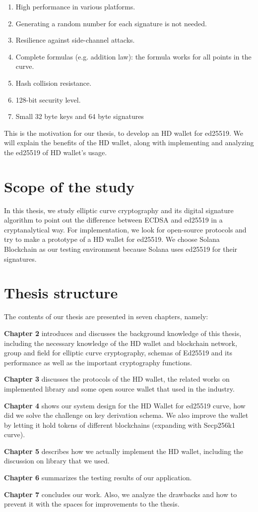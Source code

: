 \begin{enumerate}
    \item High performance in various platforms.   
    \item Generating a random number for each signature is not needed.
    \item Resilience against side-channel attacks.
    \item Complete formulas (e.g. addition law): the formula works for all points in the curve.
    \item Hash collision resistance.
    \item 128-bit security level.
    \item Small 32 byte keys and 64 byte signatures
\end{enumerate}
This is the motivation for our thesis, to develop an HD wallet for ed25519. We will explain the benefits of the HD wallet, along with implementing and analyzing the ed25519 of HD wallet’s usage. 

\section{Scope of the study}

In this thesis, we study elliptic curve cryptography and its digital signature algorithm to point out the difference between ECDSA and ed25519 in a cryptanalytical way. For implementation, we look for open-source protocols and try to make a prototype of a HD wallet for ed25519. We choose Solana Blockchain as our testing environment because Solana uses ed25519 for their signatures.

\section{Thesis structure}

The contents of our thesis are presented in seven chapters, namely:

\textbf{Chapter 2} introduces and discusses the background knowledge of this thesis, including the necessary knowledge of the HD wallet and blockchain network, group and field for elliptic curve cryptography, schemas of Ed25519 and its performance as well as the important cryptography functions.

\textbf{Chapter 3} discusses the protocols of the HD wallet, the related works on implemented library and some open source wallet that used in the industry. 

\textbf{Chapter 4} shows our system design for the HD Wallet for ed25519 curve, how did we solve the challenge on key derivation schema. We also improve the wallet by letting it hold tokens of different blockchains (expanding with Secp256k1 curve).

\textbf{Chapter 5} describes how we actually implement the HD wallet, including the discussion on library that we used.

\textbf{Chapter 6} summarizes the testing results of our application.

\textbf{Chapter 7} concludes our work. Also, we analyze the drawbacks and how to prevent it with the spaces for improvements to the thesis.

